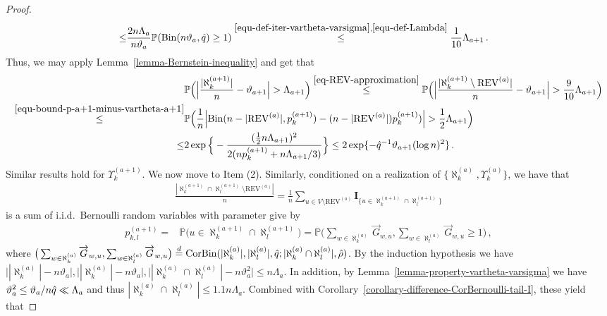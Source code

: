 \documentclass[11pt]{article}
\numberwithin{equation}{section}
\begin{document}
\begin{proof}
\begin{align}
    \leq & \frac{ 2 n \Lambda_{a} }{ n \vartheta_a }  \mathbb{P}( \mathrm{Bin} (n\vartheta_a, \Hat{q}) \geq 1 ) \overset{\eqref{equ-def-iter-vartheta-varsigma}, \eqref{equ-def-Lambda}}{\leq} \frac{1}{10} \Lambda_{a+1} \,.
    \label{equ-bound-p-a+1-minus-vartheta-a+1}
\end{align}
Thus, we may apply  Lemma~\ref{lemma-Bernstein-inequality} and get that
\begin{align}
    & \mathbb{P}\Big( \Big| \frac{|\aleph^{(a+1)}_k|}{n} - \vartheta_{a+1} \Big| > \Lambda_{a+1} \Big) \overset{\eqref{eq-REV-approximation}}{\leq} \mathbb{P} \Big( \Big| \frac{|\aleph^{(a+1)}_k \setminus \mathrm{REV}^{(a)}|}{n} - \vartheta_{a+1} \Big| > \frac{9}{10} \Lambda_{a+1} \Big) \nonumber \\
    \overset{\eqref{equ-bound-p-a+1-minus-vartheta-a+1}} {\leq} & \mathbb{P} \Big( \frac{1}{n} \Big|  \mathrm{Bin}(n-|\mathrm{REV}^{(a)}|, p^{(a+1)}_{k}) - ( n-|\mathrm{REV}^{(a)}| ) p^{(a+1)}_{k} ) \Big| > \frac{1}{2} \Lambda_{a+1} \Big) \nonumber \\
    \leq & 2 \exp \Big\{ - \frac{ (\frac{1}{2} n \Lambda_{a+1})^2 }{ 2 (n p^{(a+1)}_{k} +  n\Lambda_{a+1}/3 ) } \Big\} \leq 2 \exp \{ - \Hat{q}^{-1} \vartheta_{a+1} (\log n)^2 \} \,.
    \label{equ-concentration-result-1-a>0}
\end{align}
Similar results hold for $\Upsilon^{(a+1)}_k$. We now move to Item (2). Similarly, conditioned on a realization of $\{ \aleph^{(a)}_k, \Upsilon^{(a)}_k \}$, we have that
\begin{align*}
    \frac{ |\aleph^{(a+1)}_k \cap \aleph^{(a+1)}_l \setminus \mathrm{REV}^{(a)}| }{n} = \frac{1}{n} \sum_{u \in V \setminus \mathrm{REV}^{(a)}} \mathbf{I}_{ \{ u \in \aleph^{(a+1)}_k \cap \aleph^{(a+1)}_l \} }
\end{align*}
is a sum of i.i.d.\ Bernoulli random variables with parameter give by
\begin{align*}
    p^{(a+1)}_{k,l} = & \mathbb{P} \Big(u \in \aleph^{(a+1)}_k \cap \aleph^{(a+1)}_l \Big) = \mathbb{P} \Big( \sum_{ w \in \aleph^{(a)}_k } \overrightarrow{G}_{w,u} , \sum_{ w \in \aleph^{(a)}_l } \overrightarrow{G}_{w,u} \geq 1 \Big) \,, 
\end{align*}
where $\big( \sum_{w \in \aleph^{(a)}_k} \overrightarrow{G}_{w,u} , \sum_{w \in \aleph^{(a)}_l} \overrightarrow{G}_{w,u} \big) \overset{d}{=} \mathrm{CorBin}(|\aleph^{(a)}_k|, |\aleph^{(a)}_l|, \Hat{q} ; |\aleph^{(a)}_k \cap \aleph^{(a)}_l|, \Hat{\rho} )$. 
By the induction hypothesis we have $\big| |\aleph^{(a)}_k|- n\vartheta_a \big|, \big| |\aleph^{(a)}_k|- n\vartheta_a \big|, \big| |\aleph^{(a)}_k \cap \aleph^{(a)}_l| - n \vartheta_a^2 \big| \leq n \Lambda_{a}$. In addition,  by Lemma~\ref{lemma-property-vartheta-varsigma}  we have  $\vartheta_a^2 \leq \vartheta_a / n \Hat{q} \ll \Lambda_a$ and thus  $|\aleph^{(a)}_k \cap \aleph^{(a)}_l| \leq 1.1 n \Lambda_a$. Combined with Corollary~\ref{corollary-difference-CorBernoulli-tail-I}, these yield that

\end{proof}
\end{document}
